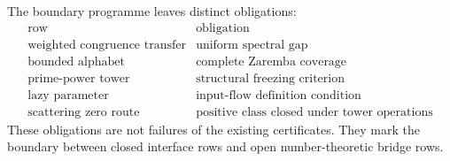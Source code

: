 \begin{principle}
\label{prin:innovation-input-boundary-obligations}
The boundary programme leaves distinct obligations:
$$
\begin{array}{c|c}
\text{row} & \text{obligation}\\
\hline
\text{weighted congruence transfer} & \text{uniform spectral gap}\\
\text{bounded alphabet} & \text{complete Zaremba coverage}\\
\text{prime-power tower} & \text{structural freezing criterion}\\
\text{lazy parameter} & \text{input-flow definition condition}\\
\text{scattering zero route} & \text{positive class closed under tower operations}
\end{array}
$$
These obligations are not failures of the existing certificates. They mark
the boundary between closed interface rows and open number-theoretic bridge
rows.
\end{principle}

